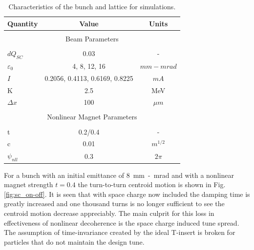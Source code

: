 \documentclass[aps,prstab,twocolumn, groupedaddress]{revtex4-1}
\begin{document}
\begin{table}
	\caption{\label{table:sc_params} Characteristics of the bunch and lattice for 
	simulations.}
	\begin{ruledtabular}
	\begin{tabular}{l|cc}
		\hline
		Quantity & Value & Units \\
		\hline
		\multicolumn{3}{c}{} \\[-1em]
		\multicolumn{3}{c}{Beam Parameters} \\
		\hline
		\\[-1em]
		$dQ_{SC}$ & 0.03 & - \\
		$\varepsilon_0$ & 4, 8, 12, 16& $mm-mrad$ \\
		$I$ &0.2056, 0.4113, 0.6169,  0.8225 & $mA$ \\
		K    &  2.5  & MeV \\
		$\Delta x$& 100 & $\mu m$ \\
		\hline
		\multicolumn{3}{c}{} \\[-1em]
		\multicolumn{3}{c}{Nonlinear Magnet Parameters} \\
		\hline
		\\[-1em]
		t & 0.2/0.4 & - \\
		c & 0.01 & $m^{1/2}$ \\
		$\psi_{nll}$& 0.3 & $2\pi$ \\
		\hline
	\end{tabular}
	\end{ruledtabular}
\end{table}	

For a bunch with an initial emittance of \SI{8}{mm-mrad} and with a nonlinear magnet 
strength $t=0.4$ the turn-to-turn centroid motion is shown in Fig. \ref{fig:sc_on-off}. It is 
seen that with space charge now included the damping time is greatly increased and one 
thousand turns is no longer sufficient to see the centroid motion decrease appreciably. 
The main culprit for this loss in effectiveness of nonlinear decoherence is the space 
charge induced tune spread. The assumption of time-invariance created by the ideal 
T-insert is broken for particles that do not maintain the design tune. 
\end{document}
